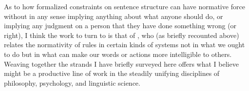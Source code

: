 \documentclass[output=paper]{langscibook}
\begin{document}
As to how formalized constraints on sentence structure can have normative force without in any sense implying anything about what anyone should do, or implying any judgment on a person that they have done something wrong (or right), I think the work to turn to is that of \citet{Millar04}, who (as briefly recounted above) relates the normativity of rules in certain kinds of systems not in what we ought to do but in what can make our words or actions more intelligible to others. Weaving together the strands I have briefly surveyed here offers what I believe might be a productive line of work in the steadily unifying disciplines of philosophy, psychology, and linguistic science.

\sloppy
\printbibliography[heading=subbibliography,notkeyword=this]
\end{document}
